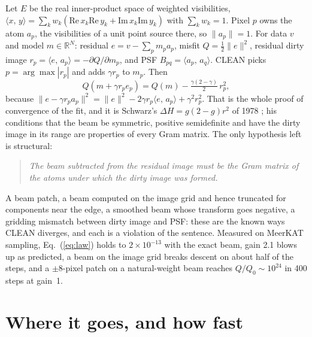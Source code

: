 \documentclass[twocolumn,10pt]{article}
\theoremstyle{remark}
\newcommand{\ip}[2]{\langle #1,\,#2\rangle}
\newcommand{\norm}[1]{\lVert #1\rVert}
\newcommand{\R}{\mathbb{R}}
\begin{document}
Let $E$ be the real inner-product space of weighted visibilities, $\ip{x}{y}=\sum_k w_k(\mathrm{Re}\,x_k\mathrm{Re}\,y_k+\mathrm{Im}\,x_k\mathrm{Im}\,y_k)$ with $\sum_kw_k=1$. Pixel $p$ owns the atom $a_p$, the visibilities of a unit point source there, so $\norm{a_p}=1$. For data $v$ and model $m\in\R^N$: residual $e=v-\sum_pm_pa_p$, misfit $Q=\tfrac12\norm e^2$, residual dirty image $r_p=\ip{e}{a_p}=-\partial Q/\partial m_p$, and PSF $B_{pq}=\ip{a_p}{a_q}$. CLEAN picks $p=\arg\max|r_p|$ and adds $\gamma r_p$ to $m_p$. Then
\begin{equation}\label{eq:law}
Q(m+\gamma r_pe_p)=Q(m)-\tfrac{\gamma(2-\gamma)}{2}\,r_p^2 ,
\end{equation}
because $\norm{e-\gamma r_pa_p}^2=\norm e^2-2\gamma r_p\ip{e}{a_p}+\gamma^2r_p^2$. That is the whole proof of convergence of the fit, and it is Schwarz's $\Delta H=g(2-g)r^2$ of 1978 \citep{schwarz78,schwarz84}; his conditions that the beam be symmetric, positive semidefinite and have the dirty image in its range are properties of every Gram matrix. The only hypothesis left is structural:

\begin{quote}\itshape
The beam subtracted from the residual image must be the Gram matrix of the atoms under which the dirty image was formed.
\end{quote}

A beam patch, a beam computed on the image grid and hence truncated for components near the edge, a smoothed beam whose transform goes negative, a gridding mismatch between dirty image and PSF: these are the known ways CLEAN diverges, and each is a violation of the sentence. Measured on MeerKAT sampling, Eq.~(\ref{eq:law}) holds to $2\times10^{-13}$ with the exact beam, gain 2.1 blows up as predicted, a beam on the image grid breaks descent on about half of the steps, and a $\pm8$-pixel patch on a natural-weight beam reaches $Q/Q_0\sim10^{24}$ in 400 steps at gain~1.

\section{Where it goes, and how fast}
\end{document}
